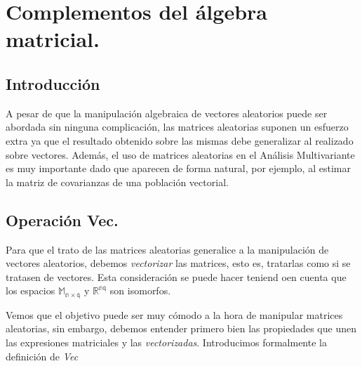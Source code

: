 \documentclass{article}
\theoremstyle{theorem-style}  %
\theoremstyle{definition}
\theoremstyle{example-style}
\begin{document}
 \maketitle



\newpage
\tableofcontents
\newpage

\section{Complementos del álgebra matricial.}

\subsection{Introducción}

A pesar de que la manipulación algebraica de vectores aleatorios puede ser abordada sin ninguna complicación, las matrices aleatorias suponen un esfuerzo extra ya que el resultado obtenido sobre las mismas debe generalizar al realizado sobre vectores. Además, el uso de matrices aleatorias en el Análisis Multivariante es muy importante dado que aparecen de forma natural, por ejemplo, al estimar la matriz de covarianzas de una población vectorial.

\subsection{Operación Vec.}

Para que el trato de las matrices aleatorias generalice a la manipulación de vectores aleatorios, debemos \textit{vectorizar} las matrices, esto es, tratarlas como si se tratasen de vectores. Esta consideración se puede hacer teniend oen cuenta que los espacios $\mathbb{M_{n \times q}}$ y $\mathbb{R^{nq}}$ son isomorfos. 

Vemos que el objetivo puede ser muy cómodo a la hora de manipular matrices aleatorias, sin embargo, debemos entender primero bien las propiedades que unen las expresiones matriciales y las \textit{vectorizadas}. Introducimos formalmente la definición de \textit{Vec}

\vspace{0.2cm}
\end{document}
